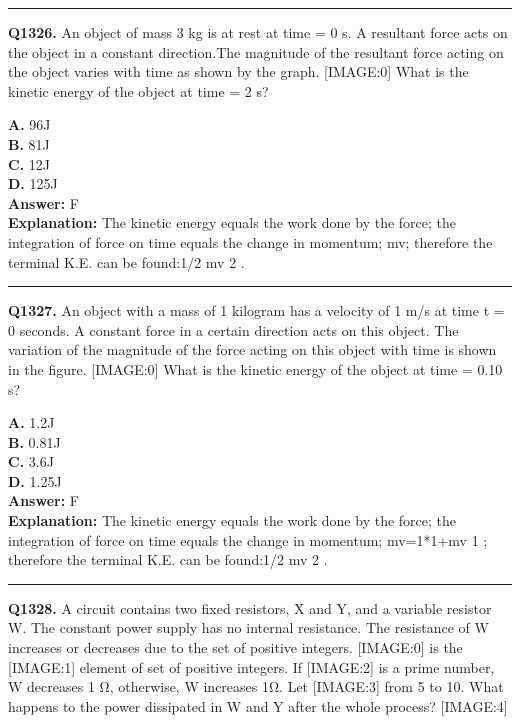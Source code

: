 \documentclass[12pt]{article}
\begin{document}
\hrule
\vspace{1em}


\noindent
\textbf{Q1326.} An object of mass 3 kg is at rest at time = 0 s. A resultant force acts on the object in a constant direction.The magnitude of the resultant force acting on the object varies with time as shown by the graph.
[IMAGE:0]
What is the kinetic energy of the object at time = 2 s?



\textbf{A.} 96J \\
\textbf{B.} 81J \\
\textbf{C.} 12J \\
\textbf{D.} 125J \\

\textbf{Answer:} F \\
\textbf{Explanation:} The kinetic energy equals the work done by the force; the integration of force on time equals the change in momentum; mv; therefore the terminal K.E. can be found:1/2 mv
2
.

\hrule
\vspace{1em}


\noindent
\textbf{Q1327.} An object with a mass of 1 kilogram has a velocity of 1 m/s at time t = 0 seconds. A constant force in a certain direction acts on this object. The variation of the magnitude
of the force acting on this object with time is shown in the figure.
[IMAGE:0]
What is the kinetic energy of the object at time = 0.10 s?



\textbf{A.} 1.2J \\
\textbf{B.} 0.81J \\
\textbf{C.} 3.6J \\
\textbf{D.} 1.25J \\

\textbf{Answer:} F \\
\textbf{Explanation:} The kinetic energy equals the work done by the force; the integration of force on time equals the change in momentum; mv=1*1+mv
1
; therefore the terminal K.E. can be found:1/2 mv
2
.

\hrule
\vspace{1em}


\noindent
\textbf{Q1328.} A circuit contains two fixed resistors, X and Y, and a variable resistor W. The constant power supply has no internal resistance.
The resistance of W increases or decreases due to the set of positive integers.
[IMAGE:0]
is the
[IMAGE:1]
element of set of positive integers. If
[IMAGE:2]
is a prime number, W decreases 1 Ω, otherwise, W increases 1Ω. Let
[IMAGE:3]
from 5 to 10. What happens to the power dissipated in W and Y after the whole process?
[IMAGE:4]
\end{document}
